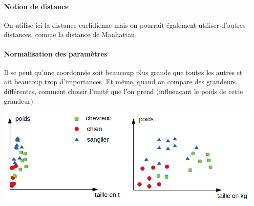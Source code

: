 \paragraph{Notion de distance} On utilise ici la distance euclidienne mais on pourrait également utiliser d'autres distances, comme la distance de Manhattan.

\paragraph{Normalisation des paramètres} Il se peut qu'une coordonnée soit beaucoup plus grande que toutes les autres et ait beaucoup trop d'importances. Et même, quand on compare des grandeurs différentes, comment choisir l'unité que l'on prend (influençant le poids de cette grandeur)

\begin{center}
	\includegraphics[scale=0.5]{Developpements/k voisins/decale.png}
\end{center}


